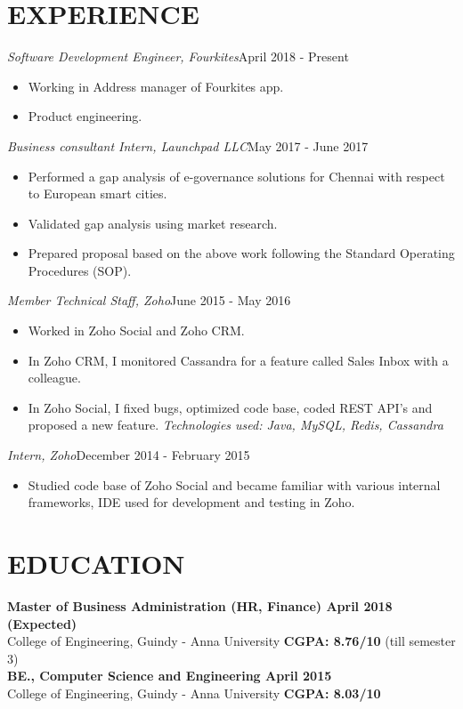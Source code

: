 \documentclass[11pt,a4paper]{article}
\begin{document}
\section*{EXPERIENCE}
\emph{Software Development Engineer, Fourkites}{\hfill April 2018 - Present}
\begin{itemize}[noitemsep]
\item Working in Address manager of Fourkites app.
\item Product engineering.
\end{itemize}
\emph{Business consultant Intern, Launchpad LLC}{\hfill May 2017 -  June 2017}
\begin{itemize}[noitemsep]
\item Performed a gap analysis of e-governance solutions for Chennai with respect to European smart cities.
\item Validated gap analysis using market research.
\item Prepared proposal based on the above work following the Standard Operating Procedures (SOP).
\end{itemize}
\emph{Member Technical Staff, Zoho}{\hfill June 2015 - May 2016}
\begin{itemize}[noitemsep]
\item Worked in Zoho Social and Zoho CRM.
\item In Zoho CRM, I monitored Cassandra for a feature called Sales Inbox with a colleague.
\item In Zoho Social, I fixed bugs, optimized code base, coded REST API's and proposed a new feature. \emph {Technologies used: Java, MySQL, Redis, Cassandra}
\end{itemize}
\emph{Intern, Zoho}{\hfill December 2014 - February 2015}
\begin{itemize}[noitemsep]
\item Studied code base of Zoho Social and became familiar with various internal frameworks, IDE used for development and testing in Zoho.
\end{itemize}
\section*{EDUCATION}
\textbf{Master of Business Administration (HR, Finance) {\hfill April 2018 (Expected)}}\\
College of Engineering, Guindy - Anna University {\hfill \textbf{CGPA: 8.76/10} (till semester 3)}\\
\textbf{BE., Computer Science and Engineering {\hfill April 2015}}\\
College of Engineering, Guindy - Anna University {\hfill \textbf{CGPA: 8.03/10}}\\
\end{document}
